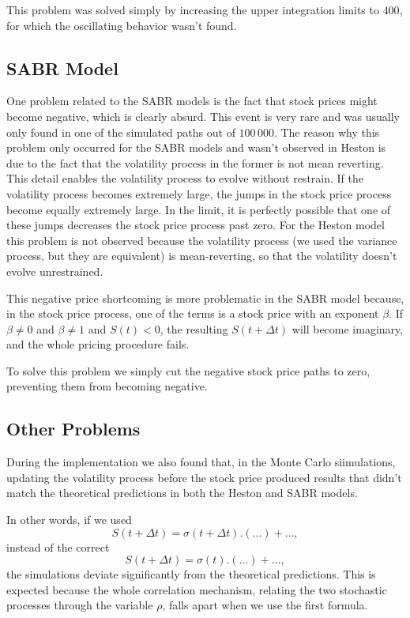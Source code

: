 This problem was solved simply by increasing the upper integration limits to $400$, for which the oscillating behavior wasn't found.



\subsection{SABR Model}
One problem related to the SABR models is the fact that stock prices might become negative, which is clearly absurd. This event is very rare and was usually only found in one of the simulated paths out of $100\,000$.
The reason why this problem only occurred for the SABR models and wasn't observed in Heston is due to the fact that the volatility process in the former is not mean reverting.
This detail enables the volatility process to evolve without restrain. If the volatility process becomes extremely large, the jumps in the stock price process become equally extremely large. In the limit, it is perfectly possible that one of these jumps decreases the stock price process past zero. For the Heston model this problem is not observed because the volatility process (we used the variance process, but they are equivalent) is mean-reverting, so that the volatility doesn't evolve unrestrained.

This negative price shortcoming is more problematic in the SABR model because, in the stock price process, one of the terms is a stock price with an exponent $\beta$. If $\beta\neq0$ and $\beta\neq1$ and $S(t)<0$, the resulting $S(t+\Delta t)$ will become imaginary, and the whole pricing procedure fails.

To solve this problem we simply cut the negative stock price paths to zero, preventing them from becoming negative.



\subsection{Other Problems}
During the implementation we also found that, in the Monte Carlo siimulations, updating the volatility process before the stock price produced results that didn't match the theoretical predictions in both the Heston and SABR models.

In other words, if we used
\begin{equation}
S(t+\Delta t)=\sigma(t+\Delta t).\left(\ldots\right)+\ldots,
\end{equation}
instead of the correct
\begin{equation}
S(t+\Delta t)=\sigma(t).\left(\ldots\right)+\ldots,
\end{equation}
\noindent the simulations deviate significantly from the theoretical predictions.
This is expected because the whole correlation mechanism, relating the two stochastic processes through the variable $\rho$, falls apart when we use the first formula.

